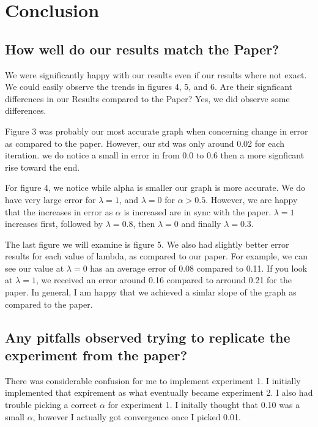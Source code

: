 \documentclass{article}
\begin{document}
\section{Conclusion}
\label{sec:orgheadline15}

\subsection{How well do our results match the Paper?}
\label{sec:orgheadline11}
We were significantly happy with our results even if our results where not exact.
We could easily observe the trends in figures 4, 5, and 6. Are their
signficant differences in our Results compared to the Paper? Yes, we
did observe some differences. 

Figure 3 was probably our most accurate graph when concerning change
in error as compared to the paper. However, our std was only around
0.02 for each iteration. we do notice a small in error in from 0.0 to
0.6 then a more signficant rise toward the end.

For figure 4, we notice while alpha is smaller our graph is more
accurate. We do have very large error for \(\lambda = 1\), and \(\lambda
= 0\) for \(\alpha > 0.5\). However, we are happy that the increases in
error as \(\alpha\) is increased are in sync with the paper. \(\lambda
=1\) increases first, followed by \(\lambda = 0.8\), then \(\lambda = 0\)
and finally \(\lambda = 0.3\).

The last figure we will examine is figure 5.  We also had slightly
better error results for each value of lambda, as compared to our
paper. For example, we can see our value at \(\lambda = 0\) has an average error of
0.08 compared to 0.11. If you look at \(\lambda = 1\), we received an
error around 0.16 compared to arround 0.21 for the paper. In general,
I am happy that we achieved a simlar slope of the graph as compared to
the paper.


\subsection{Any pitfalls observed trying to replicate the experiment from the paper?}
\label{sec:orgheadline12}
There was considerable confusion for me to implement experiment 1. I
initially implemented that expirement as what eventually became
experiment 2. I also had trouble picking a correct \(\alpha\) for
experiment 1. I initally thought that 0.10 was a small \(\alpha\), however
I actually got convergence once I picked 0.01. 
\end{document}
